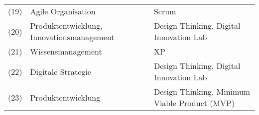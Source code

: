 \begin{sidewaystable}[ht]
\begin{tabular}{|l|p{8cm}|p{8cm}|}
		(19)                                  & Agile Organisation                                                                                                 & Scrum                                                                                            \\
		(20)             & Produktentwicklung, Innovationsmanagement                                                                          & Design Thinking, Digital Innovation Lab                                                          \\
		(21)        & Wissensmanagement                                                                                                  & XP                                                                                               \\
		(22)                  & Digitale Strategie                                                                                                 & Design Thinking, Digital Innovation Lab                                                          \\
		(23)                  & Produktentwicklung                                                                                                 & Design Thinking, Minimum Viable Product (MVP)                                                  \\
		\hline
	\end{tabular}
	\label{tab:clusteringslr2}
\end{sidewaystable}


